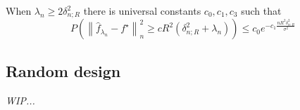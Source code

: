 \begin{theorem}
When $\lambda_n \geq 2 \delta^2_{n;R}$ there is universal constants $c_0, c_1, c_3$ such that
$$
P\left(\left\|\widehat{f}_{\lambda_{n}}-f^{\star}\right\|_{n}^{2} \geq c R^{2}\left(\delta_{n ; R}^{2}+\lambda_{n}\right) \right) \leq c_{0} e^{-c_{1} \frac{n R^{2} \delta_{n: R}^{2}}{\sigma^{2}}}
$$
\end{theorem}

\subsection{Random design}
\textit{WIP...}